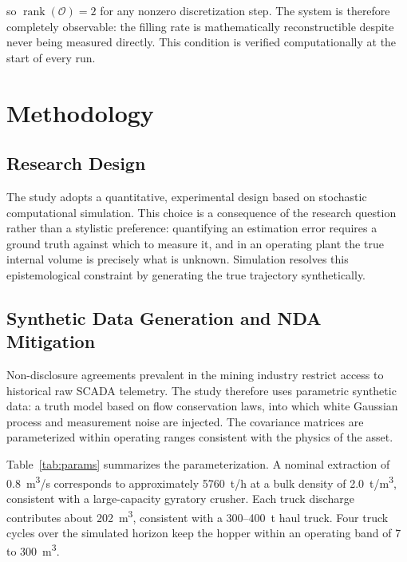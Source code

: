 \documentclass[conference]{IEEEtran}
\begin{document}
so $\operatorname{rank}(\mathcal{O}) = 2$ for any nonzero discretization step.
The system is therefore completely observable: the filling rate is
mathematically reconstructible despite never being measured directly. This
condition is verified computationally at the start of every run.

\section{Methodology}
\label{sec:method}

\subsection{Research Design}

The study adopts a quantitative, experimental design based on stochastic
computational simulation. This choice is a consequence of the research question
rather than a stylistic preference: quantifying an estimation error requires a
ground truth against which to measure it, and in an operating plant the true
internal volume is precisely what is unknown. Simulation resolves this
epistemological constraint by generating the true trajectory synthetically.

\subsection{Synthetic Data Generation and NDA Mitigation}

Non-disclosure agreements prevalent in the mining industry restrict access to
historical raw SCADA telemetry. The study therefore uses parametric synthetic
data: a truth model based on flow conservation laws, into which white Gaussian
process and measurement noise are injected. The covariance matrices are
parameterized within operating ranges consistent with the physics of the asset.

Table~\ref{tab:params} summarizes the parameterization. A nominal extraction of
0.8~m\textsuperscript{3}/s corresponds to approximately 5760~t/h at a bulk
density of 2.0~t/m\textsuperscript{3}, consistent with a large-capacity gyratory
crusher. Each truck discharge contributes about 202~m\textsuperscript{3},
consistent with a 300--400~t haul truck. Four truck cycles over the simulated
horizon keep the hopper within an operating band of 7 to
300~m\textsuperscript{3}.
\end{document}
